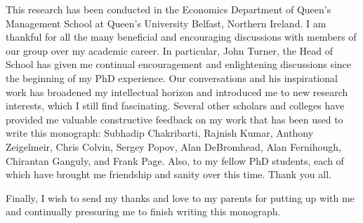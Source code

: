 \documentclass[11pt,fleqn]{book}
\begin{document}
This research has been conducted in the Economics Department of Queen's Management School at Queen's University Belfast, Northern Ireland. I am thankful for all the many beneficial and encouraging discussions with members of our group over my academic career. In particular, John Turner, the Head of School has given me continual encouragement and enlightening discussions since the beginning of my PhD experience. Our conversations and his inspirational work has broadened my intellectual horizon and introduced me to new research interests, which I still find fascinating. Several other scholars and colleges have provided me valuable constructive feedback on my work that has been used to write this monograph: Subhadip Chakribarti, Rajnish Kumar, Anthony Zeigelmeir, Chris Colvin, Sergey Popov, Alan DeBromhead, Alan Fernihough, Chirantan Ganguly, and Frank Page. Also, to my fellow PhD students, each of which have brought me friendship and sanity over this time. Thank you all.

Finally, I wish to send my thanks and love to my parents for putting up with me and continually pressuring me to finish writing this monograph.


\newpage
\mbox{}
\thispagestyle{empty}
\newpage

\setcounter{page}{1} 
\end{document}
